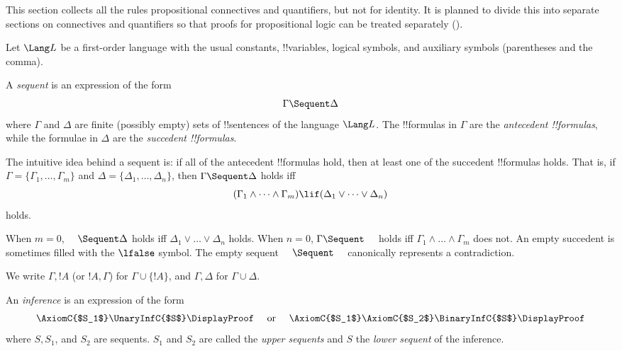 \documentclass[../../../include/open-logic-section]{subfiles}
\begin{document}


\begin{editorial}
  This section collects all the rules propositional connectives and
  quantifiers, but not for identity.  It is planned to divide this
  into separate sections on connectives and quantifiers so that proofs
  for propositional logic can be treated separately
  ().
\end{editorial}

Let $\Lang L$ be a first-order language with the usual constants,
!!{variable}s, logical symbols, and auxiliary symbols (parentheses
and the comma).

\begin{defn}[sequent]
A \emph{sequent} is an expression of the form
\[ \Gamma \Sequent \Delta \]
where $\Gamma$ and $\Delta$ are finite (possibly empty) sets of
!!{sentence}s of the language $\Lang L$. The !!{formula}s in $\Gamma$
are the \emph{antecedent !!{formula}s}, while the formulae in $\Delta$ are
the \emph{succedent !!{formula}s}.

The intuitive idea behind a sequent is: if all of the antecedent
!!{formula}s hold, then at least one of the succedent !!{formula}s
holds. That is, if $\Gamma = \{ \Gamma_1, \dots, \Gamma_m\}$ and
$\Delta = \{ \Delta_1, \dots, \Delta_n\}$, then $\Gamma \Sequent
\Delta$ holds iff
\[
(\Gamma_1 \land \cdots \land \Gamma_m) \lif (\Delta_1 \lor \cdots \lor
\Delta_n) \] holds.

When $m=0$, $\quad \Sequent \Delta$ holds iff $\Delta_1 \lor \dots
\lor \Delta_n$ holds. When $n=0$, $\Gamma \Sequent \quad$ holds iff
$\Gamma_1 \land \dots \land \Gamma_m$ does not. An empty succedent is
sometimes filled with the $\lfalse$ symbol. The empty sequent
$\quad \Sequent \quad$ canonically represents a
contradiction.
\end{defn}

We write $\Gamma, !A$ (or $!A, \Gamma$) for $\Gamma \cup \{!A\}$, and
$\Gamma, \Delta$ for $\Gamma \cup \Delta$.

\begin{defn}[Inference]
An \emph{inference} is an expression of the form
\[
\AxiomC{$S_1$}
\UnaryInfC{$S$}
\DisplayProof
\quad
\textrm{  or  }
\quad
\AxiomC{$S_1$}
\AxiomC{$S_2$}
\BinaryInfC{$S$}
\DisplayProof
\]
where $S, S_1$, and $S_2$ are sequents. $S_1$ and $S_2$ are called the
\emph{upper sequents} and $S$ the \emph{lower sequent} of the
inference.
\end{defn}
\end{document}
